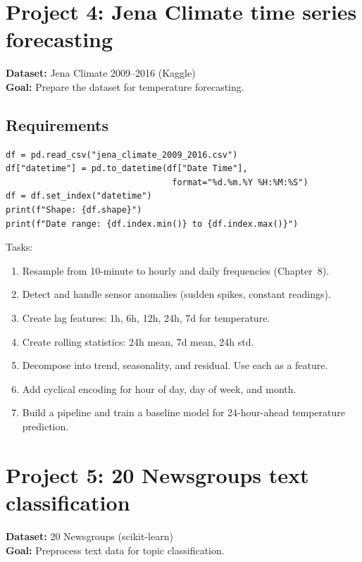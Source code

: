 \section{Project 4: Jena Climate time series forecasting}

\textbf{Dataset:} Jena Climate 2009--2016 (Kaggle)\\
\textbf{Goal:} Prepare the dataset for temperature forecasting.

\subsection{Requirements}

\begin{verbatim}
df = pd.read_csv("jena_climate_2009_2016.csv")
df["datetime"] = pd.to_datetime(df["Date Time"],
                                 format="%d.%m.%Y %H:%M:%S")
df = df.set_index("datetime")
print(f"Shape: {df.shape}")
print(f"Date range: {df.index.min()} to {df.index.max()}")
\end{verbatim}

Tasks:
\begin{enumerate}
  \item Resample from 10-minute to hourly and daily frequencies (Chapter~8).
  \item Detect and handle sensor anomalies (sudden spikes, constant readings).
  \item Create lag features: 1h, 6h, 12h, 24h, 7d for temperature.
  \item Create rolling statistics: 24h mean, 7d mean, 24h std.
  \item Decompose into trend, seasonality, and residual. Use each as a feature.
  \item Add cyclical encoding for hour of day, day of week, and month.
  \item Build a pipeline and train a baseline model for 24-hour-ahead temperature prediction.
\end{enumerate}

\section{Project 5: 20 Newsgroups text classification}

\textbf{Dataset:} 20 Newsgroups (scikit-learn)\\
\textbf{Goal:} Preprocess text data for topic classification.

